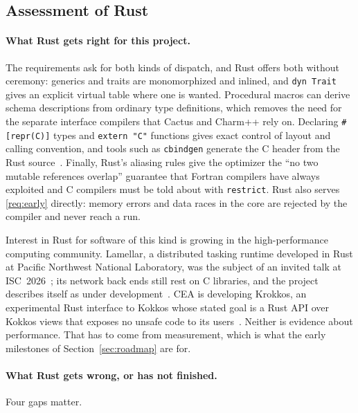 \documentclass[11pt,a4paper]{article}
\newcommand{\code}[1]{\texttt{#1}}
\begin{document}
\subsection{Assessment of Rust}

\paragraph{What Rust gets right for this project.}  The requirements ask for
both kinds of dispatch, and Rust offers both without ceremony: generics and
traits are monomorphized and inlined, and \code{dyn Trait} gives an explicit
virtual table where one is wanted.  Procedural macros can derive schema
descriptions from ordinary type definitions, which removes the need for the
separate interface compilers that Cactus and Charm++ rely on.  Declaring
\code{\#[repr(C)]} types and \code{extern "C"} functions gives exact control
of layout and calling convention, and tools such as \code{cbindgen} generate
the C header from the Rust source~\cite{cbindgen}.  Finally, Rust's aliasing
rules give the optimizer the \enquote{no two mutable references overlap}
guarantee that Fortran compilers have always exploited and C compilers must be
told about with \code{restrict}.  Rust also serves \ref{req:early} directly:
memory errors and data races in the core are rejected by the compiler and
never reach a run.

Interest in Rust for software of this kind is growing in the
high-performance computing community.  Lamellar, a distributed tasking
runtime developed in Rust at Pacific Northwest National Laboratory, was the
subject of an invited talk at ISC~2026~\cite{lamellarisc}; its network back
ends still rest on C libraries, and the project describes itself as under
development~\cite{lamellar}.  CEA is developing Krokkos, an experimental Rust
interface to Kokkos whose stated goal is a Rust API over Kokkos views that
exposes no unsafe code to its users~\cite{krokkos}.  Neither is evidence
about performance.  That has to come from measurement, which is what the
early milestones of Section~\ref{sec:roadmap} are for.

\paragraph{What Rust gets wrong, or has not finished.}  Four gaps matter.
\end{document}
